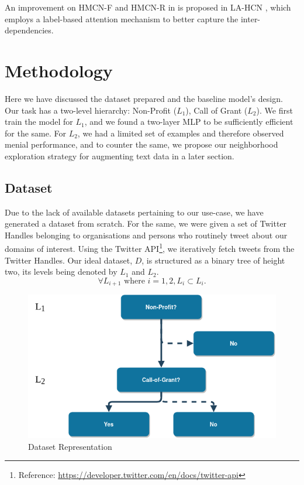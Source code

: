 \documentclass[11pt,a4paper]{article}
\begin{document}
An improvement on HMCN-F and HMCN-R in \cite{pmlr-v80-wehrmann18a} is proposed in LA-HCN \cite{zhang2021lahcn}, which employs a label-based attention mechanism to better capture the inter-dependencies.

\section{Methodology}
Here we have discussed the dataset prepared and the baseline model's design. Our task has a two-level hierarchy: Non-Profit ($L_1$), Call of Grant ($L_2$). We first train the model for $L_1$, and we found a two-layer MLP to be sufficiently efficient for the same. For $L_2$, we had a limited set of examples and therefore observed menial performance, and to counter the same, we propose our neighborhood exploration strategy for augmenting text data in a later section.
\subsection{Dataset}
Due to the lack of available datasets pertaining to our use-case, we have generated a dataset from scratch. For the same, we were given a set of Twitter Handles belonging to organisations and persons who routinely tweet about our domains of interest. Using the Twitter API\footnote[1]{Reference: \url{https://developer.twitter.com/en/docs/twitter-api}}, we iteratively fetch tweets from the Twitter Handles.
Our ideal dataset, $D$, is structured as a binary tree of height two, its levels being denoted by $L_1$ and $L_2$.
\begin{equation}
    \forall L_{i+1} \text{  where  } i = 1, 2, L_i \subset L_{i}.
\end{equation}


\begin{figure} 
    \centering
    \includegraphics[width=0.80\linewidth]{Dataset.png}
    \caption{Dataset Representation}
\end{figure}
\end{document}
